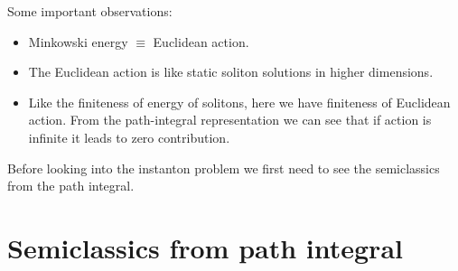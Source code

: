 \documentclass[a4paper, 12pt]{article}
\begin{document}
Some important observations:
\begin{itemize}
\item Minkowski energy $\equiv$ Euclidean action.
\item The Euclidean action is like static soliton solutions in higher dimensions.
\item  Like the finiteness of energy of solitons, here we have finiteness of Euclidean action. From the path-integral representation we can see that if action is infinite it leads to zero contribution.
\end{itemize}


Before looking into the instanton problem we first need to see the semiclassics from the path integral.


\section {Semiclassics from path integral}
\end{document}
